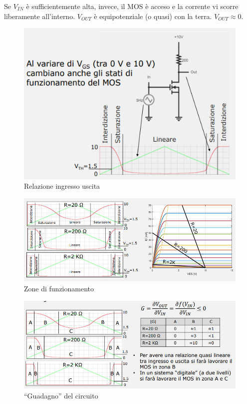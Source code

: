 \documentclass{article}
\begin{document}
Se $V_{IN}$ è sufficientemente alta, invece, il MOS è acceso e la corrente vi scorre liberamente all'interno. $V_{OUT}$ è equipotenziale (o quasi) con la terra. $V_{OUT} \approx 0$.

\begin{figure}[h]
  \centering
  \includegraphics[scale=0.58]{IM_inverter_bis}
  \caption{Relazione ingresso uscita}
  \label{Schema_inverter_bis}
\end{figure}
\clearpage
\begin{figure}[h]
  \centering
  \includegraphics[scale=0.58]{IM_inverter_ter}
  \caption{Zone di funzionamento}
  \label{Schema_inverter_ter}
\end{figure}

\begin{figure}[h]
  \centering
  \includegraphics[scale=0.58]{IM_inverter_quater}
  \caption{“Guadagno” del circuito}
  \label{Schema_inverter_quater}
\end{figure}
\end{document}
